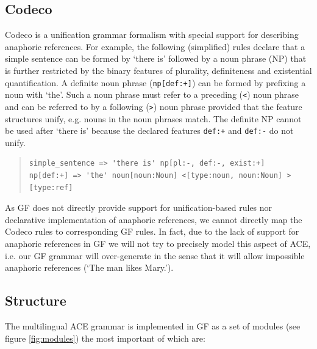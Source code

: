 \documentclass[a4paper]{article}
\begin{document}
\subsection{Codeco}

Codeco is a unification grammar formalism with special support for describing
anaphoric references. For example, the following (simplified)
rules declare that a simple
sentence can be formed by `there is' followed by
a noun phrase (NP) that is further restricted by the binary features of
plurality, definiteness and existential quantification.
A definite noun phrase (\verb!np[def:+]!) can be formed by prefixing
a noun with `the'. Such a noun phrase
must refer to a preceding (\verb!<!) noun phrase and can be referred to by a
following (\verb!>!) noun phrase provided that the feature structures
unify, e.g. nouns in the noun phrases match.
The definite NP cannot be used after `there is' because the
declared features \verb!def:+! and \verb!def:-! do not unify.

\small
\begin{quote}
\begin{verbatim}
simple_sentence => 'there is' np[pl:-, def:-, exist:+]
np[def:+] => 'the' noun[noun:Noun] <[type:noun, noun:Noun] >[type:ref]
\end{verbatim}
\end{quote}
\normalsize

As GF does not directly provide support for unification-based rules nor
declarative implementation of anaphoric references, we cannot directly map
the Codeco rules to corresponding GF rules.
In fact, due to the lack of support for
anaphoric references in GF we will not try to precisely model this aspect of
ACE, i.e. our GF grammar will over-generate in the sense that it will allow
impossible anaphoric references (`The man likes Mary.').

\subsection{Structure}

The multilingual ACE grammar is implemented in GF as a set of modules
(see figure \ref{fig:modules}) the most important of which are:
\end{document}
